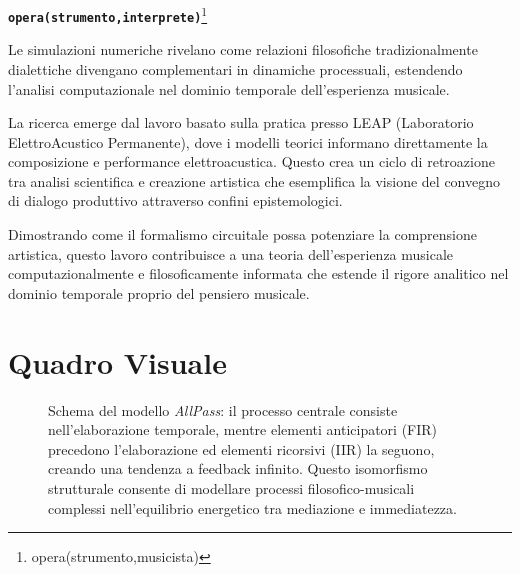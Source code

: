 \documentclass[12pt,a4paper]{article}
\newcommand{\apf}[3]{\textbf{\texttt{#1(#2,#3)}}}
\newcommand{\apfcn}[4]{\begin{center}\apf{#1}{#2}{#3}\footnote{#4}\end{center}}
\begin{document}
\apfcn{opera}{strumento}{interprete}{opera(strumento,musicista)}

Le simulazioni numeriche rivelano come relazioni filosofiche tradizionalmente dialettiche divengano complementari in dinamiche processuali, estendendo l'analisi computazionale nel dominio temporale dell'esperienza musicale.

La ricerca emerge dal lavoro basato sulla pratica presso LEAP (Laboratorio ElettroAcustico Permanente), dove i modelli teorici informano direttamente la composizione e performance elettroacustica. Questo crea un ciclo di retroazione tra analisi scientifica e creazione artistica che esemplifica la visione del convegno di dialogo produttivo attraverso confini epistemologici.

Dimostrando come il formalismo circuitale possa potenziare la comprensione artistica, questo lavoro contribuisce a una teoria dell'esperienza musicale computazionalmente e filosoficamente informata che estende il rigore analitico nel dominio temporale proprio del pensiero musicale.

\clearpage

\section*{Quadro Visuale}

\begin{figure}[htbp]
\begin{center}
\caption{Schema del modello \emph{AllPass}: il processo centrale consiste nell'elaborazione temporale, mentre elementi anticipatori (FIR) precedono l'elaborazione ed elementi ricorsivi (IIR) la seguono, creando una tendenza a feedback infinito. Questo isomorfismo strutturale consente di modellare processi filosofico-musicali complessi nell'equilibrio energetico tra mediazione e immediatezza.}
\label{apf}
\end{center}
\end{figure}
\end{document}
